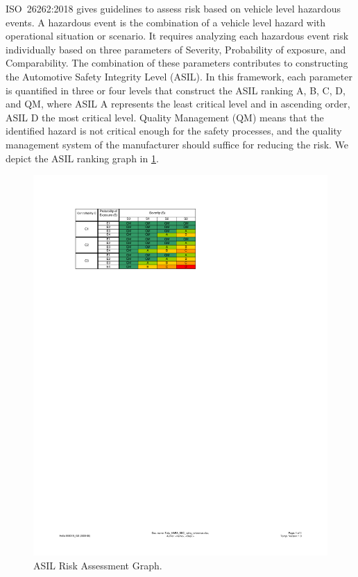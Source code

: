 ISO~26262:2018 gives guidelines to assess risk based on vehicle level hazardous events. A hazardous event is the combination of a vehicle level hazard with operational situation or scenario. It requires analyzing each hazardous event risk individually based on three parameters of Severity, Probability of exposure, and Comparability. The combination of these parameters contributes to constructing the Automotive Safety Integrity Level (ASIL). In this framework, each parameter is quantified in three or four levels that construct the ASIL ranking A, B, C, D, and QM, where ASIL A represents the least critical level and in ascending order, ASIL D the most critical level. Quality Management (QM) means that the identified hazard is not critical enough for the safety processes, and the quality management system of the manufacturer should suffice for reducing the risk. We depict the ASIL ranking graph in \cref{Fig:ASILGraph}. 

\begin{figure}
	\centering
	\includegraphics[width=0.9\linewidth]{./figures/ASIL}
	\caption{ASIL Risk Assessment Graph.}
	\label{Fig:ASILGraph}
\end{figure}

